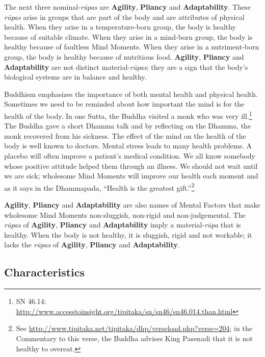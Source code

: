 
The next three nominal-\textit{rūpas} are \textbf{Agility}, \textbf{Pliancy} and \textbf{Adaptability}. These \textit{rūpas} arise in groups that are part of the body and are attributes of physical health. When they arise in a temperature-born group, the body is healthy because of suitable climate. When they arise in a mind-born group, the body is healthy because of faultless Mind Moments. When they arise in a nutriment-born group, the body is healthy because of nutritious food. \textbf{Agility}, \textbf{Pliancy} and \textbf{Adaptability} are not distinct material-\textit{rūpas}; they are a sign that the body’s biological systems are in balance and healthy.

Buddhism emphasizes the importance of both mental health and physical health. Sometimes we need to be reminded about how important the mind is for the health of the body. In one Sutta, the Buddha visited a monk who was very ill.\footnote{SN 46.14: \url{http://www.accesstoinsight.org/tipitaka/sn/sn46/sn46.014.than.html}} The Buddha gave a short Dhamma talk and by reflecting on the Dhamma, the monk recovered from his sickness. The effect of the mind on the health of the body is well known to doctors. Mental stress leads to many health problems. A placebo will often improve a patient’s medical condition. We all know somebody whose positive attitude helped them through an illness. We should not wait until we are sick; wholesome Mind Moments will improve our health each moment and as it says in the Dhammapada, “Health is the greatest gift.”\footnote{See \url{http://www.tipitaka.net/tipitaka/dhp/verseload.php?verse=204}; in the Commentary to this verse, the Buddha advises King Pasenadi that it is not healthy to overeat.}

\textbf{Agility}, \textbf{Pliancy} and \textbf{Adaptability} are also names of Mental Factors that make wholesome Mind Moments non-sluggish, non-rigid and non-judgemental. The \textit{rūpas} of \textbf{Agility}, \textbf{Pliancy} and \textbf{Adaptability} imply a material-\textit{rūpa} that is healthy. When the body is not healthy, it is sluggish, rigid and not workable; it lacks the \textit{rūpas} of \textbf{Agility}, \textbf{Pliancy} and \textbf{Adaptability}.

\subsection*{Characteristics}

